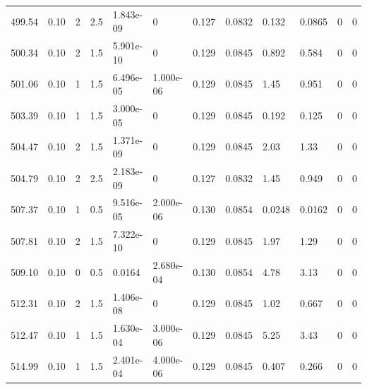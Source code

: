 \documentclass[preview]{standalone}
\begin{document}
{{{{{{{{\begin{tabular}{L{1.2cm}C{1.2cm} C{0.3cm}C{0.5cm} C{1.4cm}C{1.4cm} C{1.4cm}C{1.4cm} C{1.6cm}C{1.6cm} C{1.6cm}C{1.6cm}}
  499.54  &  0.10  & 2     & 2.5 &  1.843e-09  & 0  &  0.127&   0.0832& 0.132 & 0.0865   &  0 & 0  \\ 
  500.34  &  0.10  & 2     & 1.5 &  5.901e-10  & 0  &  0.129&   0.0845& 0.892 & 0.584   &  0 & 0  \\ 
  501.06  &  0.10  & 1     & 1.5 &  6.496e-05  & 1.000e-06  &  0.129&   0.0845& 1.45 & 0.951   &  0 & 0  \\ 
  503.39  &  0.10  & 1     & 1.5 &  3.000e-05  & 0  &  0.129&   0.0845& 0.192 & 0.125   &  0 & 0  \\ 
  504.47  &  0.10  & 2     & 1.5 &  1.371e-09  & 0  &  0.129&   0.0845& 2.03 & 1.33   &  0 & 0  \\ 
  504.79  &  0.10  & 2     & 2.5 &  2.183e-09  & 0  &  0.127&   0.0832& 1.45 & 0.949   &  0 & 0  \\ 
  507.37  &  0.10  & 1     & 0.5 &  9.516e-05  & 2.000e-06  &  0.130&   0.0854& 0.0248 & 0.0162   &  0 & 0  \\ 
  507.81  &  0.10  & 2     & 1.5 &  7.322e-10  & 0  &  0.129&   0.0845& 1.97 & 1.29   &  0 & 0  \\ 
  509.10  &  0.10  & 0     & 0.5 &  0.0164  & 2.680e-04  &  0.130&   0.0854& 4.78 & 3.13   &  0 & 0  \\ 
  512.31  &  0.10  & 2     & 1.5 &  1.406e-08  & 0  &  0.129&   0.0845& 1.02 & 0.667   &  0 & 0  \\ 
  512.47  &  0.10  & 1     & 1.5 &  1.630e-04  & 3.000e-06  &  0.129&   0.0845& 5.25 & 3.43   &  0 & 0  \\ 
  514.99  &  0.10  & 1     & 1.5 &  2.401e-04  & 4.000e-06  &  0.129&   0.0845& 0.407 & 0.266   &  0 & 0  \\ 
\hline 
\end{tabular} 

}}}}}}}}
\end{document}
